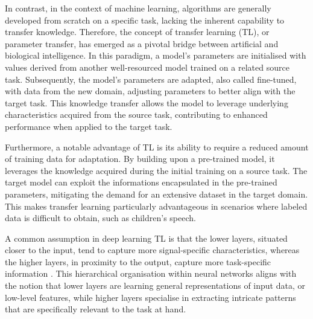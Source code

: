 In contrast, in the context of machine learning, algorithms are generally developed from scratch on a specific task, lacking the inherent capability to transfer knowledge. Therefore, the concept of transfer learning (TL), or parameter transfer, has emerged as a pivotal bridge between artificial and biological intelligence. In this paradigm, a model's parameters are initialised with values derived from another well-resourced model trained on a related source task. Subsequently, the model's parameters are adapted, also called fine-tuned, with data from the new domain, adjusting parameters to better align with the target task. This knowledge transfer allows the model to leverage underlying characteristics acquired from the source task, contributing to enhanced performance when applied to the target task.

Furthermore, a notable advantage of TL is its ability to require a reduced amount of training data for adaptation. By building upon a pre-trained model, it leverages the knowledge acquired during the initial training on a source task. The target model can exploit the informations encapsulated in the pre-trained parameters, mitigating the demand for an extensive dataset in the target domain. This makes transfer learning particularly advantageous in scenarios where labeled data is difficult to obtain, such as children's speech.

A common assumption in deep learning TL is that the lower layers, situated closer to the input, tend to capture more signal-specific characteristics, whereas the higher layers, in proximity to the output, capture more task-specific information \cite{tfbased, yosinski2014transferable}. This hierarchical organisation within neural networks aligns with the notion that lower layers are learning general representations of input data, or low-level features, while higher layers specialise in extracting intricate patterns that are specifically relevant to the task at hand. 

